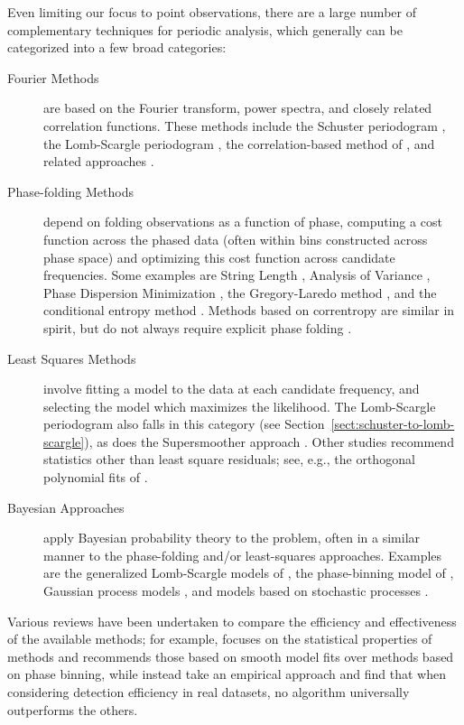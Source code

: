 \documentclass[preprint]{aastex}
\newcommand{\Sect}[1]{Section~\ref{sect:#1}}
\newcommand{\sect}[1]{\Sect{#1}}
\begin{document}
Even limiting our focus to point observations, there are a large number of
complementary techniques for periodic analysis, which generally can be
categorized into a few broad categories:
\begin{description}
  \item[Fourier Methods] are based on the Fourier transform, power spectra,
    and closely related correlation functions. These methods include the
    Schuster periodogram \citep{Schuster98}, the Lomb-Scargle periodogram
    \citep{Lomb76, Scargle82}, the correlation-based method of
    \citet{Edelson88}, and related approaches
    \citep[see also][for a discussion of wavelet transforms in this
      context]{Foster96}.
  \item[Phase-folding Methods] depend on folding
    observations as a function of phase, computing a cost function across
    the phased data (often within bins constructed across phase space)
    and optimizing this cost function across candidate frequencies.
    Some examples are
    String Length \citep{Dworetsky83},
    Analysis of Variance \citep{Schwarzenberg-Czerny89},
    Phase Dispersion Minimization \citep{Stellingwerf78},
    the Gregory-Laredo method \citep{Gregory92},
    and the conditional entropy method \citep{Graham2013}.
    Methods based on correntropy are similar in spirit, but do not always
    require explicit phase folding \citep{Huijse2011,Huijse2012}.
  \item[Least Squares Methods] involve fitting a model to the data at each
    candidate frequency, and selecting the model which maximizes the likelihood.
    The Lomb-Scargle periodogram also falls in this category
    (see \sect{schuster-to-lomb-scargle}), as does the Supersmoother approach
    \citep{Reimann94}. Other studies recommend statistics other than
    least square residuals; see, e.g., the orthogonal polynomial fits of
    \citet{Schwarzenberg-Czerny96}.
  \item[Bayesian Approaches] apply Bayesian probability theory to the problem,
    often in a similar manner to the phase-folding and/or least-squares
    approaches.
    Examples are the generalized Lomb-Scargle models of \citet{Bretthorst88},
    the phase-binning model of \citet{Gregory92}, Gaussian process models
    \citep[e.g.][]{Wang2012}, and models based on stochastic processes
    \citep[e.g.][]{Kelly14}.
\end{description}
Various reviews have been undertaken to compare the efficiency and effectiveness
of the available methods; for example, \citet{Schwarzenberg-Czerny99}
focuses on the statistical properties of methods and recommends those
based on smooth model fits over methods based on phase binning,
while \citet{Graham2013b} instead take an empirical approach and find that
when considering detection efficiency in real datasets, no algorithm
universally outperforms the others.
\end{document}
